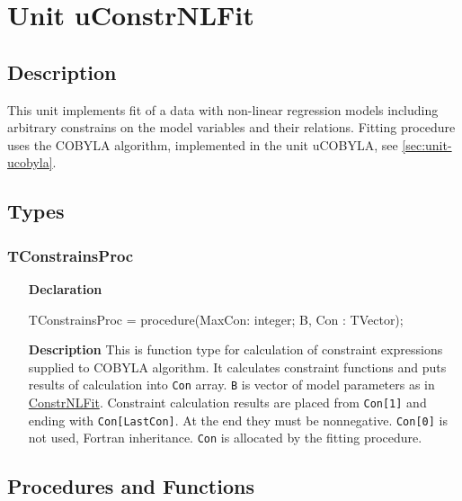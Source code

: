 \documentclass[12pt,a4paper,oneside]{report}
\newcommand{\declarationitem}[1]{\textbf{#1}}
\newcommand{\descriptiontitle}[1]{\textbf{#1}}
\newcommand{\code}[1]{\texttt{#1}}
\begin{document}
\section{Unit uConstrNLFit}\label{sec:unit-uconstrnlfit}
\subsection{Description}
This unit implements fit of a data with non-linear regression models including arbitrary constrains on the model variables and their relations. Fitting procedure uses the COBYLA algorithm, implemented in the unit uCOBYLA, see \ref{sec:unit-ucobyla}. 
\subsection{Types}
\subsubsection{TConstrainsProc}
\label{uconstrnlfit:tconstrainsproc}
\begin{itemize}
\item[\declarationitem{Declaration}\hfill]
\begin{flushleft}
	TConstrainsProc = procedure(MaxCon: integer; B, Con : TVector);
\end{flushleft}
\item[\descriptiontitle{Description}]
This is function type for calculation of constraint expressions supplied to COBYLA algorithm. It calculates constraint functions and puts results of calculation into \code{Con} array. \code{B} is vector of model parameters as in \hyperref[uconstrnlfit-constrnlfit]{ConstrNLFit}. Constraint calculation results are placed from \code{Con[1]} and ending with \code{Con[LastCon]}. At the end they must be nonnegative.
\code{Con[0]} is not used, Fortran inheritance. \code{Con} is allocated by the fitting procedure.
\end{itemize}
\subsection{Procedures and Functions}
\end{document}
